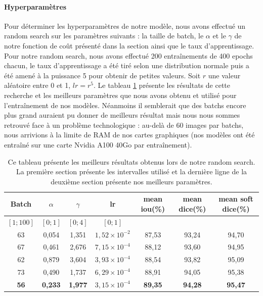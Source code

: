 \documentclass[french, english]{article}
\begin{document}
\paragraph{Hyperparamètres}
\label{hyperparameters}
Pour déterminer les hyperparamètres de notre modèle, nous avons effectué un random search sur les paramètres suivants : la taille de batch, le \(\alpha\) et le \(\gamma\) de notre fonction de coût présenté dans la section  ainsi que le taux d'apprentissage. Pour notre random search, nous avons effectué 200 entraînements de 400 epochs chacun, le taux d'apprentissage a été tiré selon une distribution normale puis a été amené à la puissance 5 pour obtenir de petites valeurs. Soit \(r\) une valeur aléatoire entre 0 et 1, \(lr = r^5\). Le tableau \ref{tab:comp_params} présente les résultats de cette recherche et les meilleurs paramètres que nous avons obtenu et utilisé pour l'entraînement de nos modèles. Néanmoins il semblerait que des batchs encore plus grand auraient pu donner de meilleurs résultat mais nous nous sommes retrouvé face à un problème technologique : au-delà de 60 images par batchs, nous arrivions à la limite de RAM de nos cartes graphiques (nos modèles ont été entraîné sur une carte Nvidia A100 40Go par entraînement).

\begin{table}[H]
    \footnotesize
    \centering
    \begin{tabular}{c c c c c c c}
        \hline
        Batch & \(\alpha\) & \(\gamma\) & lr & mean iou(\%) & mean dice(\%) & mean soft dice(\%)\\
        \hline
        \hline
        \([1;100]\) & \([0;1]\) & \([0;4]\) & \([0;1]\) \\
        \hline
        63 & 0,054 & 1,351 & \(1,52\times 10^{-2}\) & 87,53 & 93,24 & 94,70\\
        67 & 0,461 & 2,676 & \(7,15\times 10^{-4}\) & 88,12 & 93,60 & 94,95\\
        62 & 0,879 & 3,604 & \(3,93\times 10^{-4}\) & 88,54 & 93,82 & 95,09\\
        73 & 0,490 & 1,737 & \(6,29\times 10^{-4}\) & 88,91 & 94,05 & 95,38\\
        \textbf{56} & \textbf{0,233} & \textbf{1,977} & \textbf{\(3,15\times 10^{-4}\)} & \textbf{89,35} & \textbf{94,28} & \textbf{95,47}\\
        \hline
    \end{tabular}
    \caption{Ce tableau présente les meilleurs résultats obtenus lors de notre random search. La première section présente les intervalles utilisé et la dernière ligne de la deuxième section présente nos meilleurs paramètres.}
    \label{tab:comp_params}
\end{table}
\end{document}
